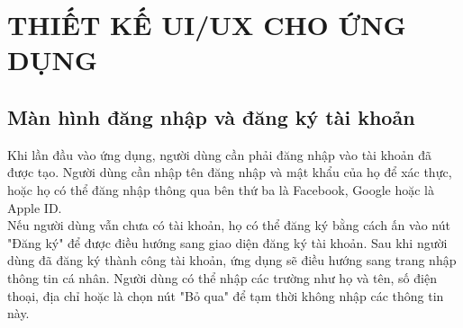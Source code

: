 \section{THIẾT KẾ UI/UX CHO ỨNG DỤNG}
\subsection{Màn hình đăng nhập và đăng ký tài khoản}
Khi lần đầu vào ứng dụng, người dùng cần phải đăng nhập vào tài khoản đã được tạo. Người dùng cần nhập tên đăng nhập và mật khẩu của họ để xác thực, hoặc họ có thể đăng nhập thông qua bên thứ ba là Facebook, Google hoặc là Apple ID.\\
Nếu người dùng vẫn chưa có tài khoản, họ có thể đăng ký bằng cách ấn vào nút "Đăng ký" để được điều hướng sang giao diện đăng ký tài khoản. Sau khi người dùng đã đăng ký thành công tài khoản, ứng dụng sẽ điều hướng sang trang nhập thông tin cá nhân. Người dùng có thể nhập các trường như họ và tên, số điện thoại, địa chỉ hoặc là chọn nút "Bỏ qua" để tạm thời không nhập các thông tin này.
